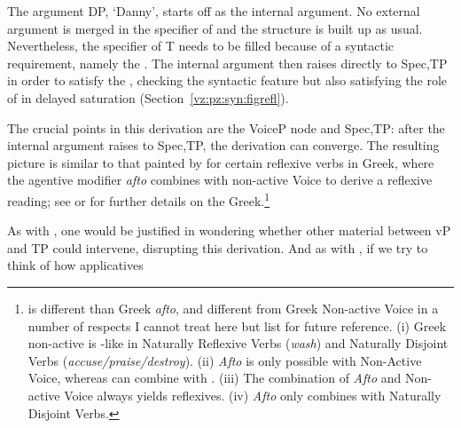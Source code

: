 \begin{exe}
\begin{xlist}
\begin{xlist}
\begin{exe}
\begin{xlist}
\begin{xlist}
\begin{exe}
\begin{xlist}
\begin{xlist}
\begin{exe}
\begin{exe}
\begin{xlist}
\begin{exe}
\begin{exe}
\begin{xlist}
\begin{exe}
\begin{exe}
\begin{exe}
\begin{exe}
\begin{exe}
\begin{xlist}
\begin{exe}
\begin{xlist}
\begin{exe}
\begin{exe}
\begin{xlist}
\begin{exe}
\begin{xlist}
\begin{exe}
\begin{xlist}
\begin{exe}
\begin{exe}
\begin{exe}
\begin{xlist}
\begin{exe}
\begin{exe}
\begin{exe}
\begin{xlist}
\begin{exe}
\begin{xlist}
\begin{exe}
\begin{exe}
\begin{xlist}
\begin{exe}
\begin{exe}
\begin{exe}
\begin{exe}
\begin{xlist}
\begin{exe}
\begin{xlist}
\begin{exe}
\begin{xlist}
\begin{exe}
\begin{xlist}
\begin{exe}
\begin{xlist}
\begin{exe}
\begin{xlist}
\begin{exe}
\begin{exe}
\begin{xlist}
\begin{exe}
\begin{xlist}
\begin{exe}
\begin{exe}
\begin{xlist}
\begin{exe}
\begin{xlist}
\begin{exe}
\begin{exe}
\begin{exe}
\begin{exe}
\begin{xlist}
\begin{xlist}
\begin{exe}
\begin{xlist}
\begin{exe}
\begin{exe}
\begin{exe}
\begin{xlist}
\begin{exe}
\begin{exe}
\begin{xlist}
\begin{exe}
\begin{exe}
\begin{exe}
\begin{xlist}
\begin{xlist}
\begin{exe}
\begin{xlist}
\begin{exe}
\begin{exe}
\begin{exe}
\begin{exe}
\begin{xlist}
\begin{exe}
\begin{xlist}
\begin{exe}
\begin{xlist}
\begin{exe}
\begin{xlist}
\begin{exe}
\begin{exe}
\begin{exe}
\begin{sidewaysfigure}
 \end{sidewaysfigure}

The argument DP, `Danny', starts off as the internal argument. No external argument is merged in the specifier of {\vz} and the structure is built up as usual. Nevertheless, the specifier of T needs to be filled because of a syntactic requirement, namely the . The internal argument then raises directly to Spec,TP in order to satisfy the , checking the syntactic feature but also satisfying the  role of {\vz} in delayed saturation (Section~\ref{vz:pz:syn:figrefl}).

The crucial points in this derivation are the VoiceP node and Spec,TP: after the internal argument raises to Spec,TP, the derivation can converge. The resulting picture is similar to that painted by \cite{spathasetal15} for certain reflexive verbs in Greek, where the agentive modifier \emph{afto} combines with non-active Voice to derive a reflexive reading; see \cite{spathasetal15} or \cite{kastner17gjgl} for further details on the Greek.\footnote{{\va} is different than Greek \emph{afto}, and {\vz} different from Greek Non-active Voice in a number of respects I cannot treat here but list for future reference. (i) Greek non-active is -like in Naturally Reflexive Verbs (\emph{wash}) and Naturally Disjoint Verbs (\emph{accuse/praise/destroy}). (ii) \emph{Afto} is only possible with Non-Active Voice, whereas {\va} can combine with . (iii) The combination of \emph{Afto} and Non-active Voice always yields reflexives. (iv) \emph{Afto} only combines with Naturally Disjoint Verbs.}

As with , one would be justified in wondering whether other material between vP and TP could intervene, disrupting this derivation. And as with , if we try to think of how applicatives 
\end{exe}
\end{exe}
\end{exe}
\end{xlist}
\end{exe}
\end{xlist}
\end{exe}
\end{xlist}
\end{exe}
\end{xlist}
\end{exe}
\end{exe}
\end{exe}
\end{exe}
\end{xlist}
\end{exe}
\end{xlist}
\end{xlist}
\end{exe}
\end{exe}
\end{exe}
\end{xlist}
\end{exe}
\end{exe}
\end{xlist}
\end{exe}
\end{exe}
\end{exe}
\end{xlist}
\end{exe}
\end{xlist}
\end{xlist}
\end{exe}
\end{exe}
\end{exe}
\end{exe}
\end{xlist}
\end{exe}
\end{xlist}
\end{exe}
\end{exe}
\end{xlist}
\end{exe}
\end{xlist}
\end{exe}
\end{exe}
\end{xlist}
\end{exe}
\end{xlist}
\end{exe}
\end{xlist}
\end{exe}
\end{xlist}
\end{exe}
\end{xlist}
\end{exe}
\end{xlist}
\end{exe}
\end{exe}
\end{exe}
\end{exe}
\end{xlist}
\end{exe}
\end{exe}
\end{xlist}
\end{exe}
\end{xlist}
\end{exe}
\end{exe}
\end{exe}
\end{xlist}
\end{exe}
\end{exe}
\end{exe}
\end{xlist}
\end{exe}
\end{xlist}
\end{exe}
\end{xlist}
\end{exe}
\end{exe}
\end{xlist}
\end{exe}
\end{xlist}
\end{exe}
\end{exe}
\end{exe}
\end{exe}
\end{exe}
\end{xlist}
\end{exe}
\end{exe}
\end{xlist}
\end{exe}
\end{exe}
\end{xlist}
\end{xlist}
\end{exe}
\end{xlist}
\end{xlist}
\end{exe}
\end{xlist}
\end{xlist}
\end{exe}
